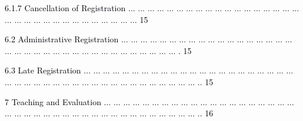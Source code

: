 \documentclass[12pt]{article}
\begin{document}
\vspace{\baselineskip}
\begin{adjustwidth}{0.5in}{0.0in}
{\fontsize{7pt}{8.4pt}\selectfont \textcolor[HTML]{00000A}{6.1.7 Cancellation of Registration $ \ldots $ $ \ldots $ $ \ldots $ $ \ldots $ $ \ldots $ $ \ldots $ $ \ldots $ $ \ldots $ $ \ldots $ $ \ldots $ $ \ldots $ $ \ldots $ $ \ldots $ $ \ldots $ $ \ldots $ $ \ldots $ $ \ldots $ $ \ldots $ $ \ldots $ $ \ldots $ $ \ldots $ $ \ldots $ $ \ldots $ $ \ldots $ $ \ldots $ $ \ldots $ $ \ldots $ $ \ldots $ $ \ldots $ $ \ldots $ $ \ldots $ $ \ldots $  15}\par}\par

\end{adjustwidth}


\vspace{\baselineskip}
\begin{adjustwidth}{0.21in}{0.0in}
{\fontsize{7pt}{8.4pt}\selectfont \textcolor[HTML]{00000A}{6.2 Administrative Registration $ \ldots $ $ \ldots $ $ \ldots $ $ \ldots $ $ \ldots $ $ \ldots $ $ \ldots $ $ \ldots $ $ \ldots $ $ \ldots $ $ \ldots $ $ \ldots $ $ \ldots $ $ \ldots $ $ \ldots $ $ \ldots $ $ \ldots $ $ \ldots $ $ \ldots $ $ \ldots $ $ \ldots $ $ \ldots $ $ \ldots $ $ \ldots $ $ \ldots $ $ \ldots $ $ \ldots $ $ \ldots $ $ \ldots $ $ \ldots $ $ \ldots $ $ \ldots $ $ \ldots $ $ \ldots $ $ \ldots $ $ \ldots $ . 15}\par}\par

\end{adjustwidth}


\vspace{\baselineskip}
\begin{adjustwidth}{0.21in}{0.0in}
{\fontsize{7pt}{8.4pt}\selectfont \textcolor[HTML]{00000A}{6.3 Late Registration $ \ldots $ $ \ldots $ $ \ldots $ $ \ldots $ $ \ldots $ $ \ldots $ $ \ldots $ $ \ldots $ $ \ldots $ $ \ldots $ $ \ldots $ $ \ldots $ $ \ldots $ $ \ldots $ $ \ldots $ $ \ldots $ $ \ldots $ $ \ldots $ $ \ldots $ $ \ldots $ $ \ldots $ $ \ldots $ $ \ldots $ $ \ldots $ $ \ldots $ $ \ldots $ $ \ldots $ $ \ldots $ $ \ldots $ $ \ldots $ $ \ldots $ $ \ldots $ $ \ldots $ $ \ldots $ $ \ldots $ $ \ldots $ $ \ldots $ $ \ldots $ $ \ldots $ $ \ldots $ $ \ldots $ $ \ldots $ .. 15}\par}\par

\end{adjustwidth}


\vspace{\baselineskip}
{\fontsize{7pt}{8.4pt}\selectfont \textcolor[HTML]{00000A}{7 Teaching and Evaluation $ \ldots $ $ \ldots $ $ \ldots $ $ \ldots $ $ \ldots $ $ \ldots $ $ \ldots $ $ \ldots $ $ \ldots $ $ \ldots $ $ \ldots $ $ \ldots $ $ \ldots $ $ \ldots $ $ \ldots $ $ \ldots $ $ \ldots $ $ \ldots $ $ \ldots $ $ \ldots $ $ \ldots $ $ \ldots $ $ \ldots $ $ \ldots $ $ \ldots $ $ \ldots $ $ \ldots $ $ \ldots $ $ \ldots $ $ \ldots $ $ \ldots $ $ \ldots $ $ \ldots $ $ \ldots $ $ \ldots $ $ \ldots $ $ \ldots $ $ \ldots $ $ \ldots $ $ \ldots $ .. 16}\par}\par
\end{document}
